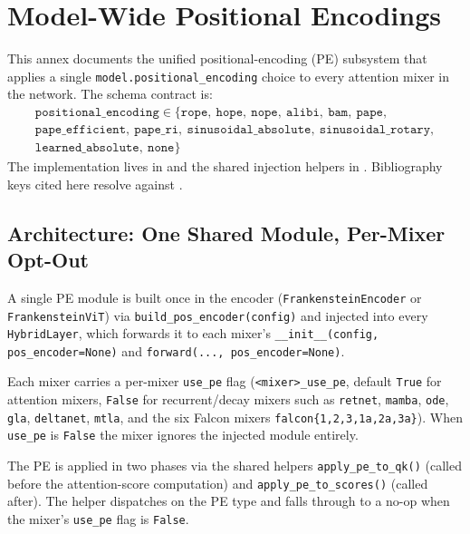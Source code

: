 \section{Model-Wide Positional Encodings}
\label{sec:annex-positional-encodings}

This annex documents the unified positional-encoding (PE) subsystem that
applies a single \texttt{model.positional\_encoding} choice to every
attention mixer in the network. The schema contract is:
\[
\begin{gathered}
\texttt{positional\_encoding} \in \{\texttt{rope},\ \texttt{hope},\ \texttt{nope},\ \texttt{alibi},\ \texttt{bam},\ \texttt{pape},\\
\texttt{pape\_efficient},\ \texttt{pape\_ri},\ \texttt{sinusoidal\_absolute},\ \texttt{sinusoidal\_rotary},\\
\texttt{learned\_absolute},\ \texttt{none}\}
\end{gathered}
\]
The implementation lives in  and the shared
injection helpers in . Bibliography
keys cited here resolve against .

\subsection{Architecture: One Shared Module, Per-Mixer Opt-Out}

A single PE module is built once in the encoder
(\texttt{FrankensteinEncoder} or \texttt{FrankensteinViT}) via
\texttt{build\_pos\_encoder(config)} and injected into every
\texttt{HybridLayer}, which forwards it to each mixer's
\texttt{\_\_init\_\_(config, pos\_encoder=None)} and
\texttt{forward(..., pos\_encoder=None)}.

Each mixer carries a per-mixer \texttt{use\_pe} flag
(\texttt{<mixer>\_use\_pe}, default \texttt{True} for attention
mixers, \texttt{False} for recurrent/decay mixers such as
\texttt{retnet}, \texttt{mamba}, \texttt{ode}, \texttt{gla},
\texttt{deltanet}, \texttt{mtla}, and the six Falcon
mixers \texttt{falcon\{1,2,3,1a,2a,3a\}}). When \texttt{use\_pe} is
\texttt{False} the mixer ignores the injected module entirely.

The PE is applied in two phases via the shared helpers
\texttt{apply\_pe\_to\_qk()} (called before the attention-score
computation) and \texttt{apply\_pe\_to\_scores()} (called after). The
helper dispatches on the PE type and falls through to a no-op when the
mixer's \texttt{use\_pe} flag is \texttt{False}.

